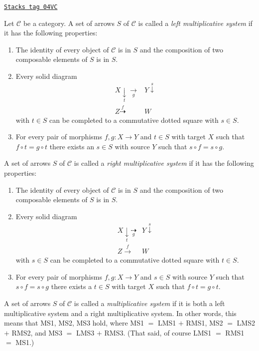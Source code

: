\begin{definition}
\label{categories-definition-multiplicative-system}
\href{https://stacks.math.columbia.edu/tag/04VC}{\texttt{Stacks tag 04VC}}

Let $\mathcal{C}$ be a category. A set of arrows $S$ of $\mathcal{C}$ is
called a {\it left multiplicative system} if it has the following properties:
\begin{enumerate}
\item[LMS1] The identity of every object of $\mathcal{C}$ is in $S$ and
the composition of two composable elements of $S$ is in $S$.
\item[LMS2] Every solid diagram
$$
\begin{array}{cc}X \underset{t}{\downarrow}\underset{g}{\longrightarrow} & Y \overset{s}{\downarrow} \\ Z \overset{f}{\dashrightarrow} & W\end{array}
$$
with $t \in S$ can be completed to a commutative dotted square with
$s \in S$.
\item[LMS3] For every pair of morphisms $f, g : X \to Y$ and
$t \in S$ with target $X$ such that $f \circ t = g \circ t$
there exists an $s \in S$ with source $Y$ such that
$s \circ f = s \circ g$.
\end{enumerate}
A set of arrows $S$ of $\mathcal{C}$ is
called a {\it right multiplicative system}
if it has the following properties:
\begin{enumerate}
\item[RMS1] The identity of every object of $\mathcal{C}$ is in $S$ and
the composition of two composable elements of $S$ is in $S$.
\item[RMS2] Every solid diagram
$$
\begin{array}{cc}X \underset{t}{\downarrow}\underset{g}{\dashrightarrow} & Y \overset{s}{\downarrow} \\ Z \overset{f}{\longrightarrow} & W\end{array}
$$
with $s \in S$ can be completed to a commutative dotted square with
$t \in S$.
\item[RMS3] For every pair of morphisms $f, g : X \to Y$ and
$s \in S$ with source $Y$ such that $s \circ f = s \circ g$
there exists a $t \in S$ with target $X$ such that
$f \circ t = g \circ t$.
\end{enumerate}
A set of arrows $S$ of $\mathcal{C}$ is called a {\it multiplicative system}
if it is both a left multiplicative system and a right multiplicative system.
In other words, this means that MS1, MS2, MS3 hold, where
MS1 $=$ LMS1 $+$ RMS1, MS2 $=$ LMS2 $+$ RMS2, and
MS3 $=$ LMS3 $+$ RMS3. (That said, of course LMS1 $=$ RMS1
$=$ MS1.)
\end{definition}

